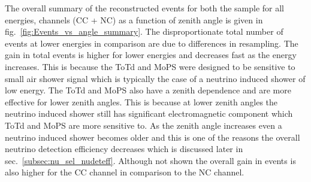 The overall summary of the reconstructed events for both the sample for all energies, channels (CC + NC) as a function of zenith angle is given in fig.~\ref{fig:Events_vs_angle_summary}. The disproportionate total number of events at lower energies in comparison are due to differences in resampling. The gain in total events is higher for lower energies and decreases fast as the energy increases. This is because the ToTd and MoPS were designed to be sensitive to small air shower signal which is typically the case of a neutrino induced shower of low energy. The ToTd and MoPS also have a zenith dependence and are more effective for lower zenith angles. This is because at lower zenith angles the neutrino induced shower still has significant electromagnetic component which ToTd and MoPS are more sensitive to. As the zenith angle increases even a neutrino induced shower becomes older and this is one of the reasons the overall neutrino detection efficiency decreases which is discussed later in sec.~\ref{subsec:nu_sel_nudeteff}. Although not shown the overall gain in events is also higher for the CC channel in comparison to the NC channel. 

